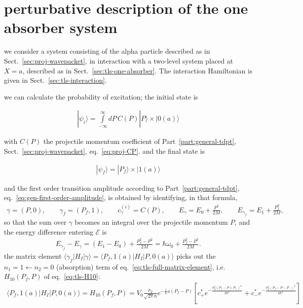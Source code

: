 \section{perturbative description of the one absorber system}\label{sect:tls-one-absorber-perturbative}

we consider a system consisting of the alpha particle described as in Sect.~\ref{sec:proj-wavepacket}, in interaction with a two-level system placed at $X=a$, described as in Sect.~\ref{sec:tls-one-absorber}. The interaction Hamiltonian is given in Sect.~\ref{sec:tls-interaction}.

we can calculate the probability of excitation; the initial state is
\begin{importantbox}
    \begin{align}
        |\psi_i\rangle = \int\limits_{-\infty}^{\infty} dP\, C(P)|P\rangle\times|0(a)\rangle
    \end{align}
\end{importantbox}
with $C(P)$ the projectile momentum coefficient of Part~\ref{part:general-tdpt}, Sect.~\ref{sec:proj-wavepacket}, eq.~\eqref{eq:proj-CP}.
and the final state is
\begin{importantbox}
    \begin{align}
        |\psi_f\rangle = |P_f\rangle\times|1(a)\rangle
    \end{align}
\end{importantbox}
and the first order transition amplitude according to Part~\ref{part:general-tdpt}, eq.~\eqref{eq:gen-first-order-amplitude}, is obtained by identifying, in that formula,
\begin{align}
    \gamma = (P,0),\qquad \gamma_f = (P_f,1),\qquad c_\gamma^{(i)} = C(P),\qquad E_\gamma = E_0+\frac{P^2}{2M},\qquad E_{\gamma_f} = E_1+\frac{P_f^2}{2M},
\end{align}
so that the sum over $\gamma$ becomes an integral over the projectile momentum $P$, and the energy difference entering $\mathcal E$ is
\begin{align}
    E_{\gamma_f}-E_\gamma = (E_1-E_0)+\frac{P_f^2-P^2}{2M} = \hbar\omega_0+\frac{P_f^2-P^2}{2M}.
\end{align}
the matrix element $\langle \gamma_f|H_I|\gamma\rangle = \langle P_f,1(a)|H_I|P,0(a)\rangle$ picks out the $n_1=1\leftarrow n_2=0$ (absorption) term of eq.~\eqref{eq:tls-full-matrix-element}, i.e.\ $H_{10}(P_f,P)$ of eq.~\eqref{eq:tls-H10}:
\begin{align}
    \langle P_f,1(a)|H_I|P,0(a)\rangle = H_{10}(P_f,P) = V_0\frac{\sigma_V}{\sqrt{2\pi}\hbar}e^{-\frac{i}{\hbar}a(P_f-P)}\left[c_+^*e^{-\frac{\sigma_V^2(P_f-P+P_+)^2}{2\hbar^2}}+c_-^*e^{-\frac{\sigma_V^2(P_f-P-P_-)^2}{2\hbar^2}}\right]\label{eq:tls-one-absorber-matrix-element}
\end{align}

